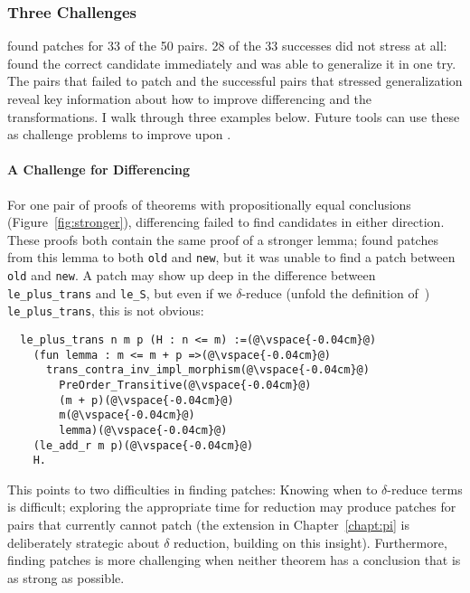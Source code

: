 \subsubsection{Three Challenges}
\label{sec:fail}

\sysname found patches for 33 of the 50 pairs. 28 of the 33 successes
did not stress \sysname at all: \sysname found the correct candidate immediately and was able to generalize it
in one try.
The pairs that \sysname failed to patch and the successful pairs that stressed generalization
reveal key information about how to improve differencing and the transformations.
I walk through three examples below.
Future tools can use these as challenge problems to improve upon \sysname.

\paragraph{A Challenge for Differencing} For one pair of proofs of theorems 
with propositionally equal conclusions (Figure~\ref{fig:stronger}),
differencing failed to find candidates in either direction.
These proofs both contain the same proof of a stronger lemma;
\sysname found patches from this lemma to
both \lstinline{old} and \lstinline{new},
but it was unable to find a patch between \lstinline{old} and \lstinline{new}.
A patch may show up deep in the difference between \lstinline{le_plus_trans}
and \lstinline{le_S}, but even if we $\delta$-reduce (unfold the definition of~\cite{equality}) \lstinline{le_plus_trans}, this is not obvious:

\begin{lstlisting}
  le_plus_trans n m p (H : n <= m) :=(@\vspace{-0.04cm}@)
    (fun lemma : m <= m + p =>(@\vspace{-0.04cm}@)
      trans_contra_inv_impl_morphism(@\vspace{-0.04cm}@)
        PreOrder_Transitive(@\vspace{-0.04cm}@)
        (m + p)(@\vspace{-0.04cm}@)
        m(@\vspace{-0.04cm}@)
        lemma)(@\vspace{-0.04cm}@)
    (le_add_r m p)(@\vspace{-0.04cm}@)
    H.
\end{lstlisting}
This points to two difficulties in finding patches: Knowing when to $\delta$-reduce terms 
is difficult; exploring the appropriate time for reduction
may produce patches for pairs that \sysname currently cannot patch
(the \toolnamec extension in Chapter~\ref{chapt:pi} is deliberately strategic about $\delta$ reduction,
building on this insight).
Furthermore, finding patches is more challenging
when neither theorem has a conclusion that is as strong as possible.

